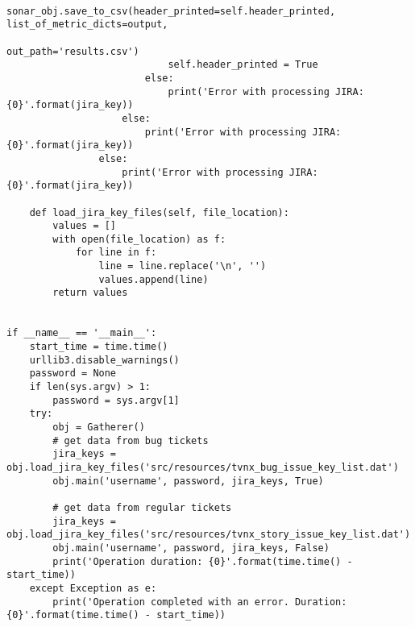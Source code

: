 \begin{landscape}
\begin{code}
\begin{verbatim}
                            sonar_obj.save_to_csv(header_printed=self.header_printed, list_of_metric_dicts=output,
                                                  out_path='results.csv')
                            self.header_printed = True
                        else:
                            print('Error with processing JIRA: {0}'.format(jira_key))
                    else:
                        print('Error with processing JIRA: {0}'.format(jira_key))
                else:
                    print('Error with processing JIRA: {0}'.format(jira_key))

    def load_jira_key_files(self, file_location):
        values = []
        with open(file_location) as f:
            for line in f:
                line = line.replace('\n', '')
                values.append(line)
        return values


if __name__ == '__main__':
    start_time = time.time()
    urllib3.disable_warnings()
    password = None
    if len(sys.argv) > 1:
        password = sys.argv[1]
    try:
        obj = Gatherer()
        # get data from bug tickets
        jira_keys = obj.load_jira_key_files('src/resources/tvnx_bug_issue_key_list.dat')
        obj.main('username', password, jira_keys, True)

        # get data from regular tickets
        jira_keys = obj.load_jira_key_files('src/resources/tvnx_story_issue_key_list.dat')
        obj.main('username', password, jira_keys, False)
        print('Operation duration: {0}'.format(time.time() - start_time))
    except Exception as e:
        print('Operation completed with an error. Duration: {0}'.format(time.time() - start_time))

\end{verbatim}
\end{code}
\end{landscape}